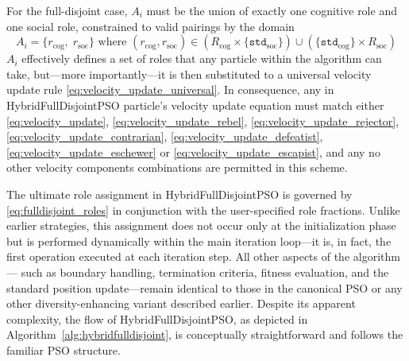 {%

For the full-disjoint case, $A_i$  must be the union of exactly one cognitive role and one social role, constrained to valid pairings by the domain
\begin{equation}\label{eq:fulldisjoint_roles}
    A_i = \{ r_\text{cog},\; r_\text{soc} \}\text{ where }(r_\text{cog}, r_\text{soc}) \in (R_\text{cog} \times \{\texttt{std}_\text{soc}\}) \cup (\{\texttt{std}_\text{cog}\} \times R_\text{soc}) 
\end{equation}
$A_i$ effectively defines a set of roles that any particle within the algorithm can take, but---more importantly---it is then substituted to a universal velocity update rule \eqref{eq:velocity_update_universal}.
In consequence, any in HybridFullDisjointPSO particle's velocity update equation must match either \eqref{eq:velocity_update}, \eqref{eq:velocity_update_rebel}, \eqref{eq:velocity_update_rejector}, \eqref{eq:velocity_update_contrarian}, \eqref{eq:velocity_update_defeatist}, \eqref{eq:velocity_update_eschewer} or \eqref{eq:velocity_update_escapist}, and any no other velocity components combinations are permitted in this scheme. 

The ultimate role assignment in HybridFullDisjointPSO is governed by \eqref{eq:fulldisjoint_roles} in conjunction with the user-specified role fractions. Unlike earlier strategies, this assignment does not occur only at the initialization phase but is performed dynamically within the main iteration loop---it is, in fact, the first operation executed at each iteration step.
All other aspects of the algorithm — such as boundary handling, termination criteria, fitness evaluation, and the standard position update---remain identical to those in the canonical PSO or any other diversity-enhancing variant described earlier.
Despite its apparent complexity, the flow of HybridFullDisjointPSO, as depicted in Algorithm~\ref{alg:hybridfulldisjoint}, is conceptually straightforward and follows the familiar PSO structure.

}
